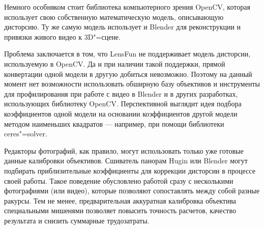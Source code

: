 \documentclass[10pt, a5paper]{article}
\begin{document}
Немного особняком стоит библиотека компьютерного зрения \linebreak OpenCV, которая использует свою собственную математическую модель, описывающую дисторсию. Ту же самую модель использует и Blender для реконструкции и привязки живого видео к 3D"=сцене.

Проблема заключается в том, что LensFun не поддерживает модель дисторсии, используемую в OpenCV. Да и при наличии такой поддержки, прямой конвертации одной модели в другую добиться невозможно. Поэтому на данный момент нет возможности использовать обширную базу объективов и инструменты для профилирования при работе с видео в Blender и в других разработках, использующих библиотеку OpenCV. Перспективной выглядит идея подбора коэффициентов одной модели на основании коэффициентов другой модели методом наименьших квадратов --- например, при помощи библиотеки ceres"=solver.

Редакторы фотографий, как правило, могут использовать только уже готовые данные калибровки объективов. Сшиватель панорам Hugin или Blender могут подбирать приблизительные коэффициенты для коррекции дисторсии в процессе своей работы. Такое поведение обусловлено работой сразу с несколькими фотографиями (или видео), которые позволяют сопоставлять между собой разные ракурсы. Тем не менее, предварительная аккуратная калибровка объектива специальными мишенями позволяет повысить точность расчетов, качество результата и снизить суммарные трудозатраты.
\end{document}

